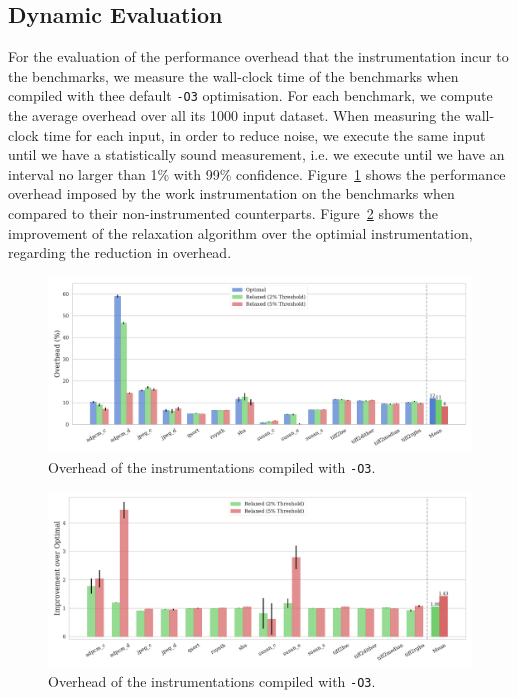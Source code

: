 \subsection{Dynamic Evaluation}

For the evaluation of the performance overhead that the instrumentation incur to the benchmarks, we measure the wall-clock time of the benchmarks when compiled with thee default \texttt{-O3} optimisation.
For each benchmark, we compute the average overhead over all its 1000 input dataset.
When measuring the wall-clock time for each input, in order to reduce noise, we execute the same input until we have a statistically sound measurement, i.e. we execute until we have an interval no larger than 1\% with 99\% confidence.
Figure~\ref{fig:overhead-O3} shows the performance overhead imposed by the work instrumentation on the benchmarks when compared to their non-instrumented counterparts.
Figure~\ref{fig:overhead-improvement-O3} shows the improvement of the relaxation algorithm over the optimial instrumentation, regarding the reduction in overhead.

\begin{figure}[ht]
    \centering
    \includegraphics[width=\textwidth]{figs/overhead-O3.pdf}
    \caption{Overhead of the instrumentations compiled with {\texttt{-O3}}.}
    \label{fig:overhead-O3}
\end{figure}

\begin{figure}[ht]
    \centering
    \includegraphics[width=\textwidth]{figs/overhead-improvement-O3.pdf}
    \caption{Overhead of the instrumentations compiled with {\texttt{-O3}}.}
    \label{fig:overhead-improvement-O3}
\end{figure}

